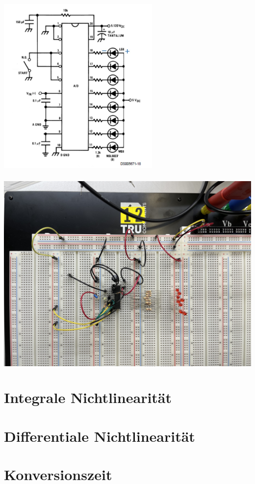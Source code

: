 \begin{center}
	\includegraphics[width=8cm,height=10cm]{images/Schaltungsskizze-versuch-eins.jpg} 
	\includegraphics[width=15cm,height=10cm]{images/Schaltungsaufbau-versuch-eins.jpeg}

\end{center}

\section{Integrale Nichtlinearität}
\section{Differentiale Nichtlinearität}
\section{Konversionszeit}
